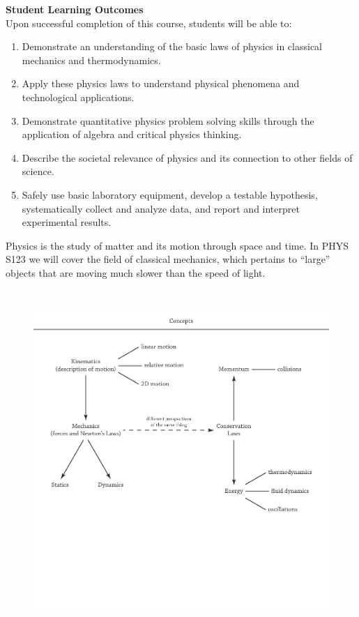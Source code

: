 \documentclass[11pt,letterpaper]{article}
\begin{document}
\textbf{Student Learning Outcomes}\\
Upon successful completion of this course, students will be able to:
\begin{enumerate}\itemsep -5pt
\item Demonstrate an understanding of the basic laws of physics in classical mechanics and thermodynamics.
\item Apply these physics laws to understand physical phenomena and technological applications.
\item Demonstrate quantitative physics problem solving skills through the application of algebra and critical physics thinking.
\item Describe the societal relevance of physics and its connection to other fields of science.
\item Safely use basic laboratory equipment, develop a testable hypothesis, systematically collect and analyze data, and report and interpret experimental results.
\end{enumerate}\bigskip

Physics is the study of matter and its motion through space and time. In PHYS S123 we will cover the field of classical mechanics, which pertains to ``large'' objects that are moving much slower than the speed of light.

\bigskip
\
\begin{figure}[h]
\begin{center}
\includegraphics[width=6.5in]{./flowchart.pdf}
\end{center}
\end{figure}
\end{document}
